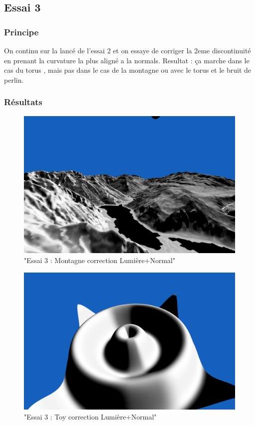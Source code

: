 \documentclass[a4paper]{article}
\begin{document}
\subsection{Essai 3}

\subsubsection{Principe}
On continu sur la lancé de l'essai 2 et on essaye de corriger la 2eme discontinuité en prenant la curvature la plus aligné a la normals. Resultat : ça marche dans le cas du torus , mais pas dans le cas de la montagne ou avec le torus et le bruit de perlin. 

\subsubsection{Résultats}

\begin{figure}[thb]
	\centering
    \includegraphics[scale=0.3]{Images/Essais/Essai_3_mount.png}
    \caption{"Essai 3 : Montagne correction Lumière+Normal"}
 \end{figure}

\begin{figure}[thb]
	\centering
    \includegraphics[scale=0.3]{Images/Essais/Essai_3_toy.png}
    \caption{"Essai 3 : Toy correction Lumière+Normal"}
 \end{figure}
\end{document}
